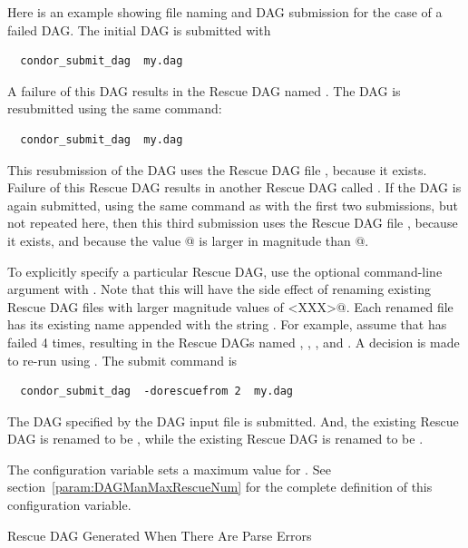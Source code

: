 Here is an example showing file naming and DAG submission
for the case of a failed DAG.
The initial DAG is submitted with
\begin{verbatim}
  condor_submit_dag  my.dag
\end{verbatim}
A failure of this DAG results in the Rescue DAG
named .
The DAG is resubmitted using the same command: 
\begin{verbatim}
  condor_submit_dag  my.dag
\end{verbatim}
This resubmission of the DAG uses the Rescue DAG file ,
because it exists.
Failure of this Rescue DAG results in another Rescue DAG
called .
If the DAG is again submitted, using the same command
as with the first two submissions, but not repeated here,
then this third submission uses the Rescue DAG file ,
because it exists, and because the value @ is larger
in magnitude than @.

To explicitly specify a particular Rescue DAG,
use the optional command-line argument 
with .
Note that this will have the side effect of renaming 
existing Rescue DAG files with larger magnitude values 
of \verb@<XXX>@.
Each renamed file has its existing name appended with
the string .
For example, assume that  has failed 4 times,
resulting in the Rescue DAGs named
,
,
,
and
.
A decision is made to re-run using .
The submit command is
\begin{verbatim}
  condor_submit_dag  -dorescuefrom 2  my.dag
\end{verbatim}
The DAG specified by the DAG input file 
is submitted.
And, the existing Rescue DAG  is
renamed to be ,
while the existing Rescue DAG  is
renamed to be .

The configuration variable 
sets a maximum value for \verb@XXX@.
See section~\ref{param:DAGManMaxRescueNum} for the complete definition
of this configuration variable.


\label{dagman:rescue_parse_error}
\begin{description}
\item[Rescue DAG Generated When There Are Parse Errors]
\end{description}

